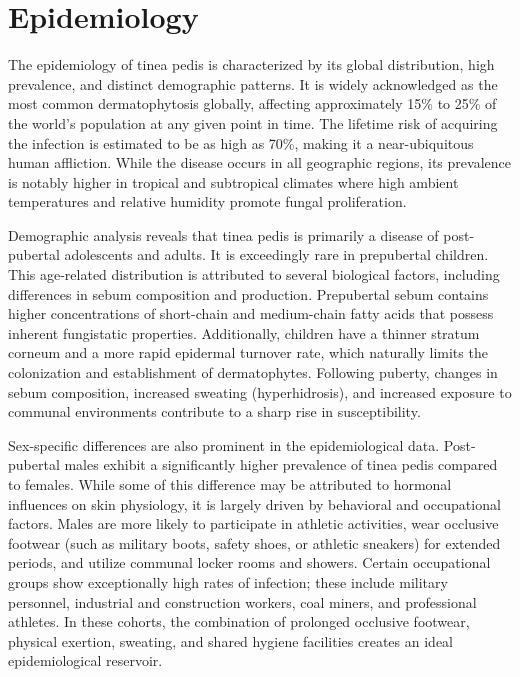 \section*{Epidemiology}
The epidemiology of tinea pedis is characterized by its global distribution, high prevalence, and distinct demographic patterns. It is widely acknowledged as the most common dermatophytosis globally, affecting approximately 15\% to 25\% of the world's population at any given point in time. The lifetime risk of acquiring the infection is estimated to be as high as 70\%, making it a near-ubiquitous human affliction. While the disease occurs in all geographic regions, its prevalence is notably higher in tropical and subtropical climates where high ambient temperatures and relative humidity promote fungal proliferation.

Demographic analysis reveals that tinea pedis is primarily a disease of post-pubertal adolescents and adults. It is exceedingly rare in prepubertal children. This age-related distribution is attributed to several biological factors, including differences in sebum composition and production. Prepubertal sebum contains higher concentrations of short-chain and medium-chain fatty acids that possess inherent fungistatic properties. Additionally, children have a thinner stratum corneum and a more rapid epidermal turnover rate, which naturally limits the colonization and establishment of dermatophytes. Following puberty, changes in sebum composition, increased sweating (hyperhidrosis), and increased exposure to communal environments contribute to a sharp rise in susceptibility.

Sex-specific differences are also prominent in the epidemiological data. Post-pubertal males exhibit a significantly higher prevalence of tinea pedis compared to females. While some of this difference may be attributed to hormonal influences on skin physiology, it is largely driven by behavioral and occupational factors. Males are more likely to participate in athletic activities, wear occlusive footwear (such as military boots, safety shoes, or athletic sneakers) for extended periods, and utilize communal locker rooms and showers. Certain occupational groups show exceptionally high rates of infection; these include military personnel, industrial and construction workers, coal miners, and professional athletes. In these cohorts, the combination of prolonged occlusive footwear, physical exertion, sweating, and shared hygiene facilities creates an ideal epidemiological reservoir.

